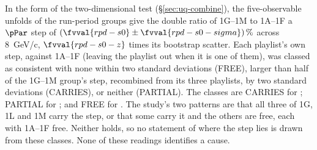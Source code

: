 In the form of the two-dimensional test (\S\ref{sec:uq-combine}), the five-observable unfolds of the run-period groups give the double ratio of 1G--1M to 1A--1F a $\pPar$ step of $(\fvval{rpd-s0}\pm\fvval{rpd-s0-sigma})\,\%$ across \SI{8}{GeV/c}, $\fvval{rpd-s0-z}$ times its bootstrap scatter. Each playlist's own step, against 1A--1F (leaving the playlist out when it is one of them), was classed as consistent with none within two standard deviations (FREE), larger than half of the 1G--1M group's step, recombined from its three playlists, by two standard deviations (CARRIES), or neither (PARTIAL). The classes are CARRIES for ; PARTIAL for ; and FREE for . The study's two patterns are that all three of 1G, 1L and 1M carry the step, or that some carry it and the others are free, each with 1A--1F free. Neither holds, so no statement of where the step lies is drawn from these classes. None of these readings identifies a cause.

